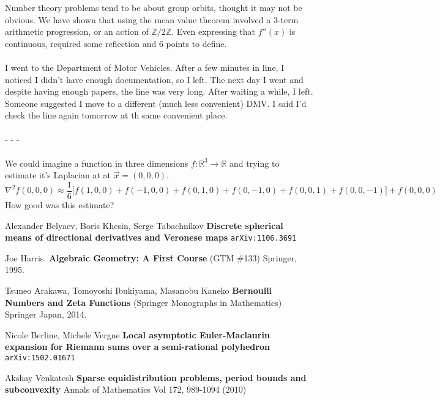 \documentclass[12pt]{article}
\begin{document}
\noindent Number theory problems tend to be about group orbits, thought it may not be obvious.  We have shown that using the mean value theorem involved a 3-term arithmetic progression, or an action of $\mathbb{Z}/2\mathbb{Z}$.  Even expressing that $f''(x)$ is continuous, required some reflection and 6 points to define. \\ \\
I went to the Department of Motor Vehicles.  After a few minutes in line, I noticed I didn't have enough documentation, so I left.  The next day I went and despite having enough papers, the line was very long.  After waiting a while, I left.  Someone suggested I move to a different (much less convenient) DMV.  I said I'd check the line again tomorrow at th same convenient place. \\ \\
- - - \\ \\
We could imagine a function in three dimensions $f: \mathbb{R}^3 \to \mathbb{R}$ and trying to estimate it's Laplacian at at $\vec{x} = (0,0,0)$.
$$
\nabla^2 f(0,0,0) \approx
\frac{1}{6} \big[f(1,0,0) + f(-1,0,0)
+ f(0,1,0) + f(0,-1,0)
+ f(0,0,1) + f(0,0,-1) \big] + f(0,0,0)
 $$  
How good was this estimate?


\vfill

\begin{thebibliography}{}

\item Alexander Belyaev, Boris Khesin, Serge Tabachnikov \textbf{Discrete spherical means of directional derivatives and Veronese maps} \texttt{arXiv:1106.3691}

\item Joe Harris. \textbf{Algebraic Geometry: A First Course} (GTM \#133) Springer, 1995.

\item Tsuneo Arakawa, Tomoyoshi Ibukiyama, Masanobu Kaneko \textbf{Bernoulli Numbers and Zeta Functions}
(Springer Monographs in Mathematics) Springer Japan, 2014.

\item Nicole Berline, Michele Vergne \textbf{Local asymptotic Euler-Maclaurin expansion for Riemann sums over a semi-rational polyhedron} \texttt{arXiv:1502.01671}

\item Akshay Venkatesh \textbf{Sparse equidistribution problems, period bounds and subconvexity} Annals of Mathematics Vol 172, 989-1094 (2010)
 
\end{thebibliography} 
\end{document}
